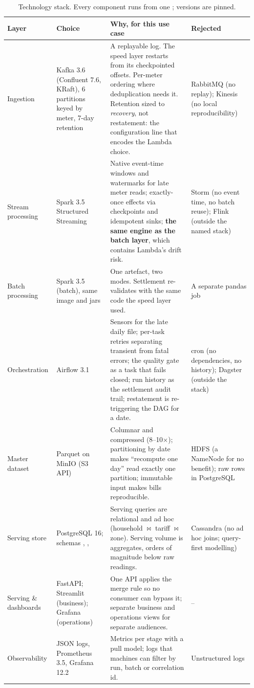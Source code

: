 \documentclass[11pt,a4paper]{article}
\newcommand{\code}[1]{\texttt{\detokenize{#1}}}
\begin{document}
\begin{table}[!htbp]
\centering\small
\caption{Technology stack. Every component runs from one \code{docker compose up}; versions are pinned.}
\label{tab:stack}
\begin{tabularx}{\linewidth}{@{}>{\raggedright\arraybackslash}p{2.05cm}>{\raggedright\arraybackslash}p{2.55cm}>{\raggedright\arraybackslash}X>{\raggedright\arraybackslash}p{2.6cm}@{}}
\toprule
\textbf{Layer} & \textbf{Choice} & \textbf{Why, for this use case} & \textbf{Rejected} \\
\midrule
Ingestion & Kafka 3.6 (Confluent 7.6, KRaft), 6 partitions keyed by meter, 7-day retention & A replayable log. The speed layer restarts from its checkpointed offsets. Per-meter ordering where deduplication needs it. Retention sized to \emph{recovery}, not restatement: the configuration line that encodes the Lambda choice. & RabbitMQ (no replay); Kinesis (no local reproducibility) \\
Stream processing & Spark 3.5 Structured Streaming & Native event-time windows and watermarks for late meter reads; exactly-once effects via checkpoints and idempotent sinks; \textbf{the same engine as the batch layer}, which contains Lambda's drift risk. & Storm (no event time, no batch reuse); Flink (outside the named stack) \\
Batch processing & Spark 3.5 (batch), same image and jars & One artefact, two modes. Settlement re-validates with the same code the speed layer used. & A separate pandas job \\
Orchestration & Airflow 3.1 & Sensors for the late daily file; per-task retries separating transient from fatal errors; the quality gate as a task that fails closed; run history as the settlement audit trail; restatement is re-triggering the DAG for a date. & cron (no dependencies, no history); Dagster (outside the stack) \\
Master dataset & Parquet on MinIO (S3 API) & Columnar and compressed (8--10$\times$); partitioning by date makes ``recompute one day'' read exactly one partition; immutable input makes bills reproducible. & HDFS (a NameNode for no benefit); raw rows in PostgreSQL \\
Serving store & PostgreSQL 16; schemas \code{speed}, \code{batch}, \code{ops} & Serving queries are relational and ad hoc (household $\bowtie$ tariff $\bowtie$ zone). Serving volume is aggregates, orders of magnitude below raw readings. & Cassandra (no ad hoc joins; query-first modelling) \\
Serving \& dashboards & FastAPI; Streamlit (business); Grafana (operations) & One API applies the merge rule so no consumer can bypass it; separate business and operations views for separate audiences. & -- \\
Observability & JSON logs, Prometheus 3.5, Grafana 12.2 & Metrics per stage with a pull model; logs that machines can filter by run, batch or correlation id. & Unstructured logs \\
\bottomrule
\end{tabularx}
\end{table}
\end{document}

